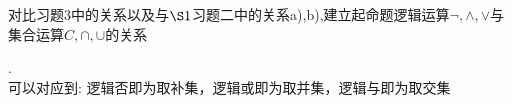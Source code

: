 \begin{exercise}
    对比习题3中的关系以及与$\S 1$习题二中的关系a),b),建立起命题逻辑运算$\lnot,\land,\lor $与集合运算$C,\cap,\cup $的关系
\end{exercise}
\begin{solution}.\\
    可以对应到: 逻辑否即为取补集，逻辑或即为取并集，逻辑与即为取交集
\end{solution}
